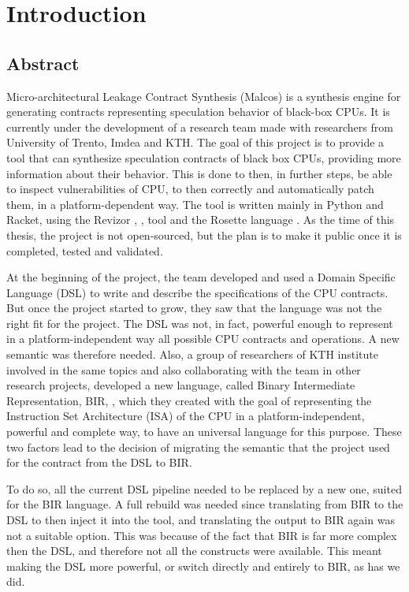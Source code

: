 \chapter{Introduction}
\label{cha:introduction}

\section{Abstract}
Micro-architectural Leakage Contract Synthesis (Malcos) is a synthesis engine
for generating contracts representing speculation behavior of black-box CPUs. It
is currently under the development of a research team made with researchers from
University of Trento, Imdea and KTH. The goal of this project is to provide a tool
that can synthesize speculation contracts of black box CPUs, providing more
information about their behavior. This is done to then, in further steps, be able
to inspect vulnerabilities of CPU, to then correctly and automatically patch
them, in a platform-dependent way. The tool is written mainly in Python and
Racket, using the Revizor \cite{article}, \cite{repo}, \cite{misc} tool and the Rosette
language \cite{ros}. As the time of this thesis, the project is not open-sourced,
but the plan is to make it public once it is completed, tested and validated.

At the beginning of the project, the team developed and used a Domain Specific
Language (DSL) to write and describe the specifications of the CPU contracts. But
once the project started to grow, they saw that the language was not the right
fit for the project. The DSL was not, in fact, powerful enough to represent in a
platform-independent way all possible CPU contracts and operations. A new
semantic was therefore needed. Also, a group of researchers of KTH institute
involved in the same topics and also collaborating with the team in other
research projects, developed a new language, called Binary Intermediate
Representation, BIR, \cite{bir_pub}, which they created with the goal of representing
the Instruction Set Architecture (ISA) of the CPU in a platform-independent,
powerful and complete way, to have an universal language for this purpose. These
two factors lead to the decision of migrating the semantic that the project used
for the contract from the DSL to BIR.

To do so, all the current DSL pipeline needed to be replaced by a new one,
suited for the BIR language. A full rebuild was needed since translating from BIR
to the DSL to then inject it into the tool, and translating the output to BIR
again was not a suitable option. This was because of the fact that BIR is far more
complex then the DSL, and therefore not all the constructs were available. This meant
making the DSL more powerful, or switch directly and entirely to BIR, as has we did.

